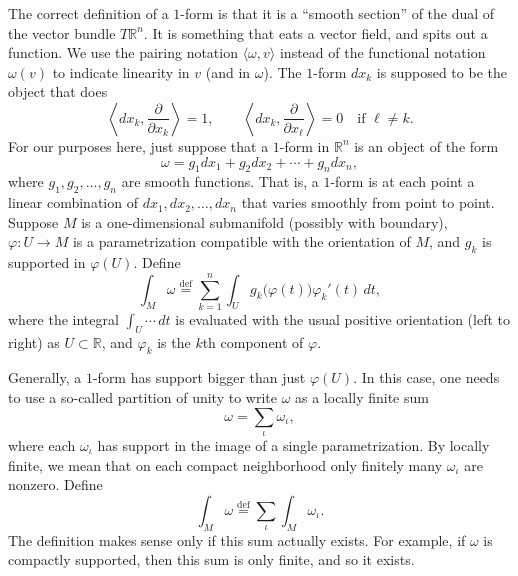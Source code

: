 \documentclass[12pt,openany]{book}
\newcommand{\R}{{\mathbb{R}}}
\theoremstyle{plain}
\theoremstyle{remark}
\theoremstyle{definition}
\theoremstyle{exercise}
\theoremstyle{example}
\begin{document}
The correct definition of a $1$-form is that it is a ``smooth section'' of
the dual of the vector bundle $T \R^n$.
It is something that eats
a vector field, and spits out a function.
We use the pairing notation $\langle \omega , v \rangle$
%
instead of the functional
notation $\omega(v)$ to indicate linearity in $v$ (and in $\omega$).
The $1$-form
$dx_k$ is supposed to be the object that does
\begin{equation*}
\left\langle
dx_k,
\frac{\partial}{\partial x_k}
\right\rangle
=
1,
\qquad
\left\langle
dx_k ,
\frac{\partial}{\partial x_\ell}
\right\rangle
=
0 \quad \text{if $\ell\not=k$}.
\end{equation*}
For our purposes here, just suppose that a $1$-form
in $\R^n$ is an object of the form
\begin{equation*}
\omega = g_1 dx_1 + g_2 dx_2 + \cdots + g_n dx_n ,
\end{equation*}
where $g_1, g_2, \ldots, g_n$ are smooth functions.  That is, a $1$-form is
at each point a linear combination of $dx_1, dx_2, \ldots, dx_n$ that
varies smoothly from point to point.
Suppose $M$ is a one-dimensional submanifold
(possibly with boundary), $\varphi \colon U \to M$
is a parametrization compatible with the orientation of $M$,
and $g_k$ is supported in $\varphi(U)$.
Define
\begin{equation*}
\int_M \omega
\overset{\text{def}}{=}
\sum_{k=1}^n
\int_U g_k\bigl( \varphi(t) \bigr) \varphi_k'(t) \, dt ,
\end{equation*}
where the integral $\int_U \cdots \, dt$
is evaluated with the usual positive orientation
(left to right) as $U \subset \R$, and $\varphi_k$ is the $k$th component
of $\varphi$.

Generally, a $1$-form has support bigger than just $\varphi(U)$.  In this
case, one needs to use a so-called partition of unity to write $\omega$
as a locally finite sum
\begin{equation*}
\omega = \sum_{\iota} \omega_\iota ,
\end{equation*}
where each $\omega_\iota$ has support in the image of a single
parametrization.  By locally finite, we mean that on each compact
neighborhood only finitely many $\omega_\iota$ are nonzero.
Define
\begin{equation*}
\int_M \omega
\overset{\text{def}}{=}
\sum_{\iota}
\int_M \omega_\iota .
\end{equation*}
The definition makes sense only
if this sum actually exists.  For example, if $\omega$ is
compactly supported, then this sum is only finite, and so it exists.
\end{document}
